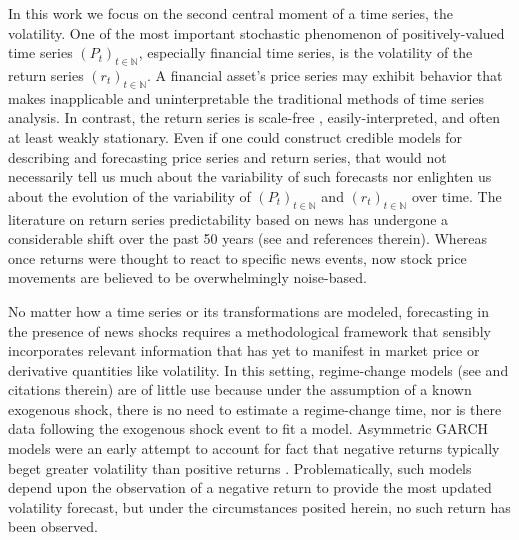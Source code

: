 \documentclass[11pt]{article}
\theoremstyle{definition}
\begin{document}
In this work we focus on the second central moment of a time series, the volatility.  One of the most important stochastic phenomenon of positively-valued time series $(P_{t})_{t\in\mathbb{N}}$, especially financial time series, is the volatility of the return series $(r_{t})_{t\in\mathbb{N}}$.  A financial asset's price series may exhibit behavior that makes inapplicable and uninterpretable the traditional methods of time series analysis.  In contrast, the return series is scale-free \citep{tsay2005analysis}, easily-interpreted, and often at least weakly stationary.  Even if one could construct credible models for describing and forecasting price series and return series, that would not necessarily tell us much about the variability of such forecasts nor enlighten us about the evolution of the variability of $(P_{t})_{t\in\mathbb{N}}$ and $(r_{t})_{t\in\mathbb{N}}$ over time.  The literature on return series predictability based on news has undergone a considerable shift over the past 50 years (see \citet{boudoukh2019information} and references therein).  Whereas once returns were thought to react to specific news events, now stock price movements are believed to be overwhelmingly noise-based.

No matter how a time series or its transformations are modeled, forecasting in the presence of news shocks requires a methodological framework that sensibly incorporates relevant information that has yet to manifest in market price or derivative quantities like volatility.  In this setting, regime-change models (see \citet{bauwens2006regime} and citations therein) are of little use because under the assumption of a known exogenous shock, there is no need to estimate a regime-change time, nor is there data following the exogenous shock event to fit a model.  Asymmetric GARCH models were an early attempt to account for fact that negative returns typically beget greater volatility than positive returns \citep{hansen2012realized}.  Problematically, such models depend upon the observation of a negative return to provide the most updated volatility forecast, but under the circumstances posited herein, no such return has been observed.
\end{document}

